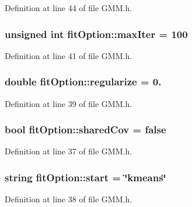 Definition at line 44 of file G\+M\+M.\+h.

\hypertarget{structfit_option_a54d1906ece53c348047c8b404ff06053}{
\subsubsection[{max\+Iter}]{\setlength{\rightskip}{0pt plus 5cm}unsigned int fit\+Option\+::max\+Iter = 100}}\label{structfit_option_a54d1906ece53c348047c8b404ff06053}


Definition at line 41 of file G\+M\+M.\+h.

\hypertarget{structfit_option_abffa02537679becf07413b31f5889e6f}{
\subsubsection[{regularize}]{\setlength{\rightskip}{0pt plus 5cm}double fit\+Option\+::regularize = 0.}}\label{structfit_option_abffa02537679becf07413b31f5889e6f}


Definition at line 39 of file G\+M\+M.\+h.

\hypertarget{structfit_option_a2efaf3629539e3864967853058e80420}{
\subsubsection[{shared\+Cov}]{\setlength{\rightskip}{0pt plus 5cm}bool fit\+Option\+::shared\+Cov = false}}\label{structfit_option_a2efaf3629539e3864967853058e80420}


Definition at line 37 of file G\+M\+M.\+h.

\hypertarget{structfit_option_a4c1ecd5ba984e2e12faa29217c78f931}{
\subsubsection[{start}]{\setlength{\rightskip}{0pt plus 5cm}string fit\+Option\+::start = \char`\"{}kmeans\char`\"{}}}\label{structfit_option_a4c1ecd5ba984e2e12faa29217c78f931}


Definition at line 38 of file G\+M\+M.\+h.

